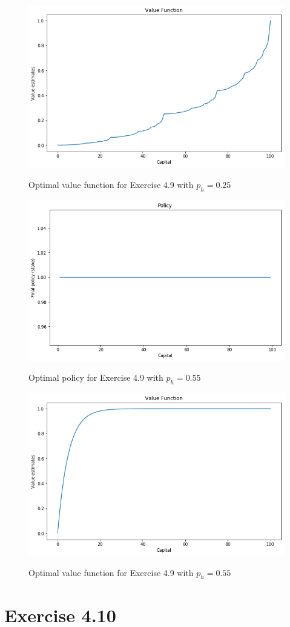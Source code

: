 \documentclass[a4paper,11pt]{article}
\numberwithin{equation}{section}
\theoremstyle{remark}
\begin{document}
\begin{figure}
	\centering
	\caption{Optimal value function for Exercise 4.9 with $p_h = 0.25$}
	\includegraphics[scale=0.75]{value_4_9_ph_25.png}
	\label{fig:value_4_9_ph_25}
\end{figure}

\begin{figure}
	\centering
	\caption{Optimal policy for Exercise 4.9 with $p_h = 0.55$}
	\includegraphics[scale=0.75]{policy_4_9_ph_55.png}
	\label{fig:policy_4_9_ph_55}
\end{figure}

\begin{figure}
	\centering
	\caption{Optimal value function for Exercise 4.9 with $p_h = 0.55$}
	\includegraphics[scale=0.75]{value_4_9_ph_55.png}
	\label{fig:value_4_9_ph_55}
\end{figure}



\section{Exercise 4.10}
\end{document}
